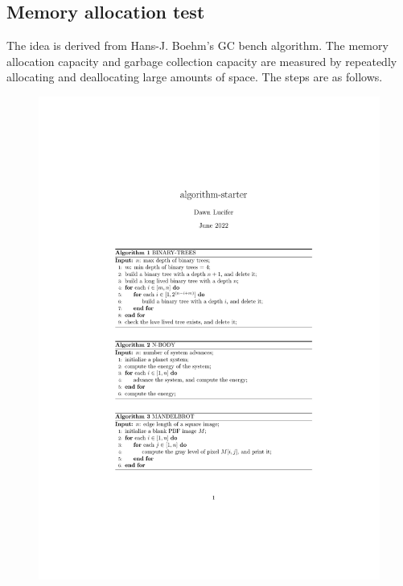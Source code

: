 \subsection{Memory allocation test}
The idea is derived from Hans-J. Boehm's GC bench algorithm.
The memory allocation capacity and garbage collection capacity are measured by repeatedly allocating and deallocating large amounts of space. The steps are as follows.

\begin{figure}[htbp]
    \centerline{\includegraphics[scale=0.8]{figures/binary-trees}}
    \label{fig:binary-trees}
\end{figure}

